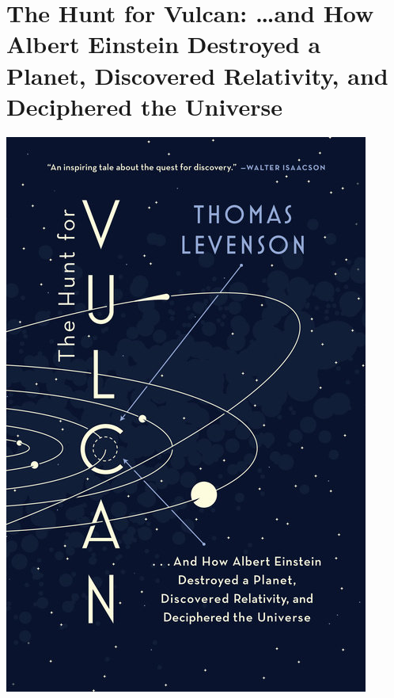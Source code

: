\documentclass{tufte-handout}
\makeatletter
\newcommand{\varcaption}[2][0pt]{%
  \gsetlength{\@tufte@caption@vertical@offset}{-#1}%
  \gdef\@tufte@stored@varcaption{#2}%
}
\gdef\@tufte@stored@varcaption{} %
\makeatother
\begin{document}
\section*{The Hunt for Vulcan: \ldots and How Albert Einstein Destroyed \newline a Planet, Discovered Relativity, and Deciphered the Universe}
\begin{marginfigure}[\baselineskip]
   \includegraphics[width=\linewidth]{images/hunt_for_vulcan.jpg}
   \varcaption{\href{https://www.penguinrandomhouse.com/books/254788/the-hunt-for-vulcan-by-thomas-levenson/9780812988307/}{Publisher Link}, \href{https://www.amazon.com/Hunt-Vulcan-Discovered-Relativity-Deciphered/dp/0812988302/}{Amazon Link}}
\end{marginfigure}
\end{document}

